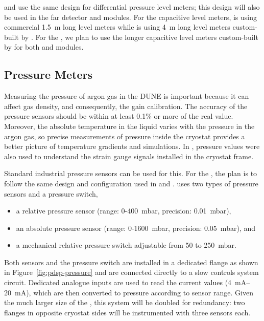  and  use the same design for differential pressure level meters; this design  will also be used in the far detector  and  modules. For the capacitive level meters,  is using commercial  \SI{1.5}{m} long level meters while  is using \SI{4}{m} long level meters custom-built by . For the  , we plan to use the longer capacitive level meters custom-built by  for both  and  modules.



\subsection{Pressure Meters}
\label{sec:fdgen-slow-cryo-press-meter}


Measuring the pressure of argon gas in the DUNE  is important because it can affect gas density, and consequently, the  gain calibration. The accuracy of the pressure sensors should be within at least 0.1\% or more of the real value. %
Moreover, the absolute temperature in the liquid varies with the pressure in the argon gas, so precise measurements of pressure inside the cryostat provides a better picture of temperature gradients and  simulations. In , pressure values were also used to understand the strain gauge signals installed in the cryostat frame.

Standard industrial pressure sensors can be used for this. For the  , the plan is to follow the same design and configuration used in  and .  uses two types of pressure sensors and a pressure switch, %
\begin{itemize}
    \item a relative pressure sensor (range: 0-400~mbar, precision: 0.01~mbar),
    \item an absolute pressure sensor (range: 0-1600~mbar, precision: 0.05~mbar), and
    \item a mechanical relative pressure switch adjustable from 50 to 250~mbar. 
\end{itemize}


Both sensors and the pressure switch are installed in a dedicated flange as shown in Figure~\ref{fig:pdsp-pressure} and are connected directly to a slow controls system  circuit. Dedicated analogue inputs are used to read the current values (\SIrange{4}{20}{mA}), which are then converted to pressure according to sensor range. Given the much larger size of the  , this system will be doubled for redundancy: two flanges in opposite cryostat sides will be instrumented with three sensors each. 

